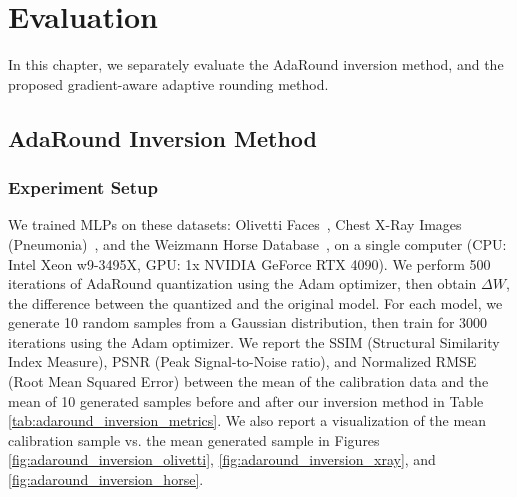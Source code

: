 \documentclass[../main.tex]{subfiles}
\begin{document}
\chapter{Evaluation}
In this chapter, we separately evaluate the AdaRound inversion method, and the proposed gradient-aware adaptive rounding method.

\section{AdaRound Inversion Method}
\subsection{Experiment Setup} \label{sec:adaround_inversion_experiment_setup}
We trained MLPs on these datasets: Olivetti Faces~\cite{JMLR:v12:pedregosa11a}, Chest X-Ray Images (Pneumonia)~\cite{kermanyIdentifyingMedicalDiagnoses2018}, and the Weizmann Horse Database~\cite{weizmannHorseDB}, on a single computer (CPU: Intel Xeon w9-3495X, GPU: 1x NVIDIA GeForce RTX 4090). We perform 500 iterations of AdaRound quantization using the Adam optimizer, then obtain $\Delta W$, the difference between the quantized and the original model. For each model, we generate 10 random samples from a Gaussian distribution, then train for 3000 iterations using the Adam optimizer. We report the SSIM (Structural Similarity Index Measure), PSNR (Peak Signal-to-Noise ratio), and Normalized RMSE (Root Mean Squared Error) between the mean of the calibration data and the mean of 10 generated samples before and after our inversion method in Table \ref{tab:adaround_inversion_metrics}. We also report a visualization of the mean calibration sample vs. the mean generated sample in Figures \ref{fig:adaround_inversion_olivetti}, \ref{fig:adaround_inversion_xray}, and \ref{fig:adaround_inversion_horse}.
\end{document}
